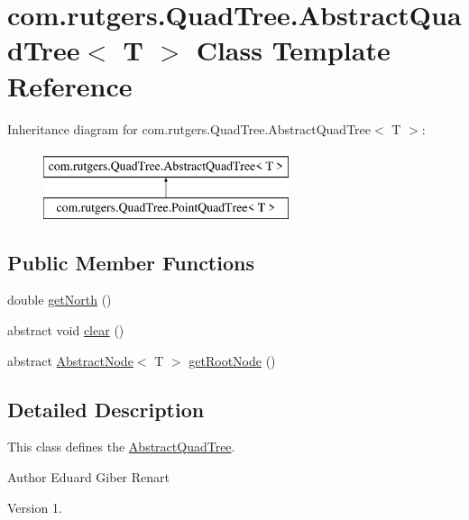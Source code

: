 \hypertarget{classcom_1_1rutgers_1_1QuadTree_1_1AbstractQuadTree}{}\section{com.\+rutgers.\+Quad\+Tree.\+Abstract\+Quad\+Tree$<$ T $>$ Class Template Reference}
\label{classcom_1_1rutgers_1_1QuadTree_1_1AbstractQuadTree}
Inheritance diagram for com.\+rutgers.\+Quad\+Tree.\+Abstract\+Quad\+Tree$<$ T $>$\+:\begin{figure}[H]
\begin{center}
\leavevmode
\includegraphics[height=2.000000cm]{classcom_1_1rutgers_1_1QuadTree_1_1AbstractQuadTree}
\end{center}
\end{figure}
\subsection*{Public Member Functions}
\begin{DoxyCompactItemize}
\item 
double \hyperlink{classcom_1_1rutgers_1_1QuadTree_1_1AbstractQuadTree_a83f2fde3929ecd03d905fd3e3fa72dc7}{get\+North} ()
\item 
abstract void \hyperlink{classcom_1_1rutgers_1_1QuadTree_1_1AbstractQuadTree_a0e4b7580a9924c3fad8409448730964a}{clear} ()
\item 
abstract \hyperlink{classcom_1_1rutgers_1_1QuadTree_1_1AbstractNode}{Abstract\+Node}$<$ T $>$ \hyperlink{classcom_1_1rutgers_1_1QuadTree_1_1AbstractQuadTree_a8cbaba782941b51f86c22b8109fa83e1}{get\+Root\+Node} ()
\end{DoxyCompactItemize}


\subsection{Detailed Description}
This class defines the \hyperlink{classcom_1_1rutgers_1_1QuadTree_1_1AbstractQuadTree}{Abstract\+Quad\+Tree}.

\begin{DoxyAuthor}{Author}
Eduard Giber Renart 
\end{DoxyAuthor}
\begin{DoxyVersion}{Version}
1. 
\end{DoxyVersion}


